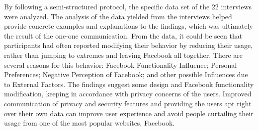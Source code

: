By following a semi-structured protocol, the specific data set of the 22 interviews were analyzed. The analysis of the data yielded from the interviews helped provide concrete examples and explanations to the findings, which was ultimately the result of the one-one communication. From the data, it could be seen that participants had often reported modifying their behavior by reducing their usage, rather than jumping to extremes and leaving Facebook all together. There are several reasons for this behavior: Facebook Functionality Influence; Personal Preferences; Negative Perception of Facebook; and other possible Influences due to External Factors. The findings suggest some design and Facebook functionality modification, keeping in accordance with privacy concerns of the users. Improved communication of privacy and security features and providing the users apt right over their own data can improve user experience and avoid people curtailing their usage from one of the most popular websites, Facebook.
